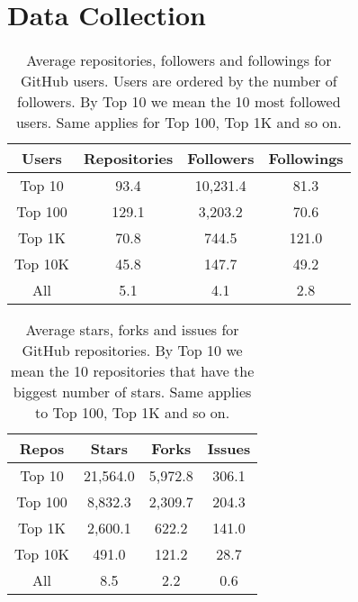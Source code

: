 
\section{Data Collection}
\label{sec:collection}
\begin{table}
\centering
\begin{tabular}{ | c | c | c | c | }
	\hline
	Users & Repositories & Followers & Followings \\ \hline
	Top 10 & 93.4 & 10,231.4 & 81.3 \\ \hline
	Top 100 & 129.1 & 3,203.2 & 70.6 \\ \hline
	Top 1K & 70.8 & 744.5 & 121.0 \\ \hline
	Top 10K & 45.8 & 147.7 & 49.2 \\ \hline
	All & 5.1 & 4.1 & 2.8 \\ \hline
\end{tabular}
\caption{Average repositories, followers and followings for GitHub users. Users are ordered by the number of followers. By Top 10 we mean the 10 most followed users. Same applies for Top 100, Top 1K and so on.}
\label{tbl:topusers}
\end{table}
\begin{table}
\centering
\begin{tabular}{ | c | c | c | c | }
	\hline
	Repos & Stars & Forks & Issues \\ \hline
	Top 10 & 21,564.0 & 5,972.8 & 306.1 \\ \hline
	Top 100 & 8,832.3 & 2,309.7 & 204.3 \\ \hline
	Top 1K & 2,600.1 & 622.2 & 141.0 \\ \hline
	Top 10K & 491.0 & 121.2 & 28.7 \\ \hline
	All & 8.5 & 2.2 & 0.6 \\ \hline
\end{tabular}
\caption{Average stars, forks and issues for GitHub repositories. By Top 10 we mean the 10 repositories that have the biggest number of stars. Same applies to Top 100, Top 1K and so on.}
\label{tbl:toprepos}
\end{table}
